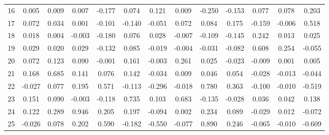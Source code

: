 \documentclass[ %
                    author={Sam Phippen},
                supervisor={Dr. Rafal Bogacz},
                     title={Real time voice activity detectors in noisy personal computing environments},
                  subtitle={},
                    degree={MEng},
                      year={2012} ]{thesis}
\begin{document}
\begin{table}
\begin{tabular}{ccccccccccccc}
        16 & 0.005  & 0.009  & 0.007  & -0.177 & 0.074  & 0.121  & 0.009  & -0.250 & -0.153 & 0.077  & 0.078  & 0.203  \\
        17 & 0.072  & 0.034  & 0.001  & -0.101 & -0.140 & -0.051 & 0.072  & 0.084  & 0.175  & -0.159 & -0.006 & 0.518  \\
        18 & 0.018  & 0.004  & -0.003 & -0.180 & 0.076  & 0.028  & -0.007 & -0.109 & -0.145 & 0.242  & 0.013  & 0.025  \\
        19 & 0.029  & 0.020  & 0.029  & -0.132 & 0.085  & -0.019 & -0.004 & -0.031 & -0.082 & 0.608  & 0.254  & -0.055 \\
        20 & 0.072  & 0.123  & 0.090  & -0.001 & 0.161  & -0.003 & 0.261  & 0.025  & -0.023 & -0.009 & 0.001  & 0.005  \\
        21 & 0.168  & 0.685  & 0.141  & 0.076  & 0.142  & -0.034 & 0.009  & 0.046  & 0.054  & -0.028 & -0.013 & -0.044 \\
        22 & -0.027 & 0.077  & 0.195  & 0.571  & -0.113 & -0.296 & -0.018 & 0.780  & 0.363  & -0.100 & -0.010 & -0.519 \\
        23 & 0.151  & 0.090  & -0.003 & -0.118 & 0.735  & 0.103  & 0.683  & -0.135 & -0.028 & 0.036  & 0.042  & 0.138  \\
        24 & 0.122  & 0.289  & 0.946  & 0.205  & 0.197  & -0.094 & 0.002  & 0.234  & 0.089  & -0.029 & 0.012  & -0.072 \\
        25 & -0.026 & 0.078  & 0.202  & 0.590  & -0.182 & -0.550 & -0.077 & 0.890  & 0.246  & -0.065 & -0.010 & -0.609 \\
    \end{tabular}
\end{table}
\end{document}
